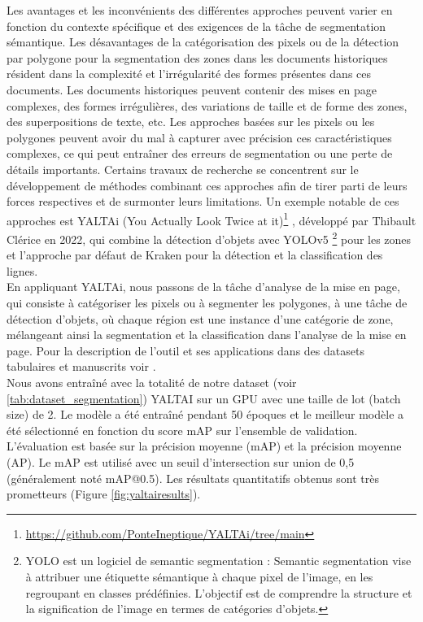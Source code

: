 \documentclass[a4paper, twoside, 12pt]{book}
\begin{document}
Les avantages et les inconvénients des différentes approches peuvent varier en fonction du contexte spécifique et des exigences de la tâche de segmentation sémantique. Les désavantages de la catégorisation des pixels ou de la détection par polygone pour la segmentation des zones dans les documents historiques résident dans la complexité et l'irrégularité des formes présentes dans ces documents. Les documents historiques peuvent contenir des mises en page complexes, des formes irrégulières, des variations de taille et de forme des zones, des superpositions de texte, etc. Les approches basées sur les pixels ou les polygones peuvent avoir du mal à capturer avec précision ces caractéristiques complexes, ce qui peut entraîner des erreurs de segmentation ou une perte de détails importants. Certains travaux de recherche se concentrent sur le développement de méthodes combinant ces approches afin de tirer parti de leurs forces respectives et de surmonter leurs limitations. Un exemple notable de ces approches est YALTAi (You Actually Look Twice at it)\footnote{\url{https://github.com/PonteIneptique/YALTAi/tree/main}}
, développé par Thibault Clérice en 2022, qui combine la détection d'objets avec YOLOv5 \footnote{YOLO est un logiciel de semantic segmentation \cite{yolo_glenn_jocher_2022_7347926}: Semantic segmentation vise à attribuer une étiquette sémantique à chaque pixel de l'image, en les regroupant en classes prédéfinies. L'objectif est de comprendre la structure et la signification de l'image en termes de catégories d'objets.} pour les zones et l'approche par défaut de Kraken pour la détection et la classification des lignes. \\
 
En appliquant YALTAi, nous passons de la tâche d'analyse de la mise en page, qui consiste à catégoriser les pixels ou à segmenter les polygones, à une tâche de détection d'objets, où chaque région est une instance d'une catégorie de zone, mélangeant ainsi la segmentation et la classification dans l'analyse de la mise en page. Pour la description de l'outil et ses applications dans des datasets tabulaires et manuscrits voir \cite{clerice2022YALTAi}.\\


Nous avons entraîné avec la totalité de notre dataset (voir \ref{tab:dataset_segmentation}) YALTAI sur un GPU avec une taille de lot (batch size) de 2. Le modèle a été entraîné pendant 50 époques et le meilleur modèle a été sélectionné en fonction du score mAP sur l'ensemble de validation. L'évaluation est basée sur la précision moyenne (mAP) et la précision moyenne (AP). Le mAP est utilisé avec un seuil d'intersection sur union de 0,5 (généralement noté mAP@0.5).  Les résultats quantitatifs obtenus sont très prometteurs (Figure \ref{fig:yaltairesults}).
\end{document}

